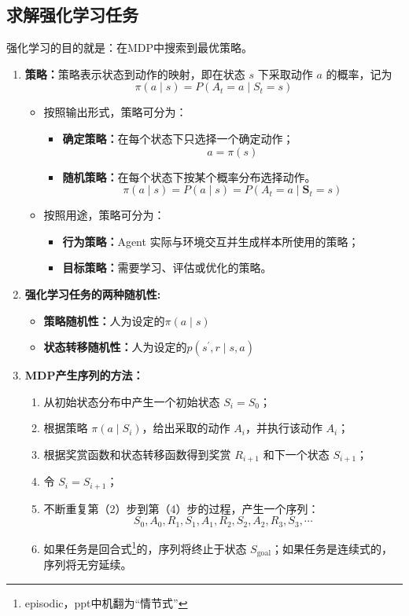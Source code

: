 \documentclass[../main.tex]{subfiles}
\begin{document}
\subsection{求解强化学习任务}\label{sec:rl-solving}
强化学习的目的就是：在MDP中搜索到最优策略。
\begin{enumerate}
    \item \textbf{策略：}策略表示状态到动作的映射，即在状态 $s$ 下采取动作 $a$ 的概率，记为
    $$
    \pi(a\mid s)=P(A_t=a\mid S_t=s)
    $$
    \begin{itemize}
        \item 按照输出形式，策略可分为：
        \begin{itemize}
            \item \textbf{确定策略：}在每个状态下只选择一个确定动作；
            $$a = \pi \left( s\right)$$
            \item \textbf{随机策略：}在每个状态下按某个概率分布选择动作。
            $$\pi \left( {a \mid  s}\right)  = P\left( {a \mid  s}\right)  = P\left( {{A}_{t} = a \mid  {\mathbf{S}}_{t} = s}\right)$$
        \end{itemize}
    
        \item 按照用途，策略可分为：
        \begin{itemize}
            \item \textbf{行为策略：}Agent 实际与环境交互并生成样本所使用的策略；
            \item \textbf{目标策略：}需要学习、评估或优化的策略。
        \end{itemize}
    \end{itemize}

    \item \textbf{强化学习任务的两种随机性:}
    \begin{itemize}
        \item \textbf{策略随机性：}人为设定的$\pi \left( {a \mid  s}\right) $
        \item \textbf{状态转移随机性：}人为设定的$p(s^{\prime},r\mid s,a)$
    \end{itemize}
    \item \textbf{MDP产生序列的方法：}
    \begin{enumerate}
        \item 从初始状态分布中产生一个初始状态 $S_i=S_0$；
        \item 根据策略 $\pi(a\mid S_i)$，给出采取的动作 $A_i$，并执行该动作 $A_i$；
        \item 根据奖赏函数和状态转移函数得到奖赏 $R_{i+1}$ 和下一个状态 $S_{i+1}$；
        \item 令 $S_i=S_{i+1}$；
        \item 不断重复第（2）步到第（4）步的过程，产生一个序列：
        $$
        S_0,A_0,R_1,S_1,A_1,R_2,S_2,A_2,R_3,S_3,\cdots
        $$
        \item 如果任务是回合式\footnote{episodic，ppt中机翻为“情节式”}的，序列将终止于状态 $S_{\text{goal}}$；如果任务是连续式的，序列将无穷延续。
    \end{enumerate}
    

\end{enumerate}
\end{document}
